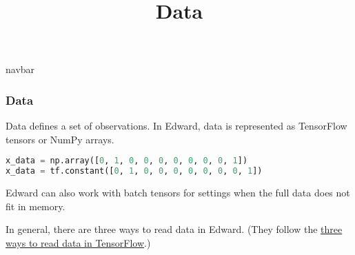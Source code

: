 \title{Data}

{{navbar}}

\subsubsection{Data}

Data defines a set of observations. In Edward, data is represented as
TensorFlow tensors or NumPy arrays.

\begin{lstlisting}[language=Python]
x_data = np.array([0, 1, 0, 0, 0, 0, 0, 0, 0, 1])
x_data = tf.constant([0, 1, 0, 0, 0, 0, 0, 0, 0, 1])
\end{lstlisting}

Edward can also work with batch tensors for settings when the full
data does not fit in memory.

In general, there are three ways to read data in Edward. (They follow
the \href{https://www.tensorflow.org/versions/master/how_tos/reading_data/index.html}
{three ways to read data in TensorFlow}.)

